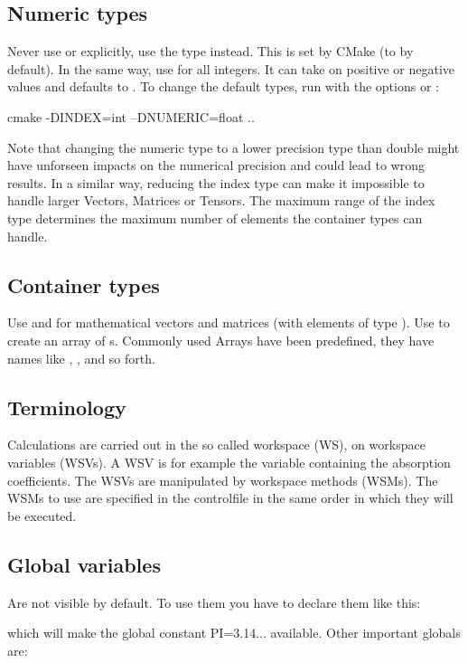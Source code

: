 \subsection{Numeric types} Never use  or
 explicitly, use the type  instead.
This is set by CMake (to  by default).
In the same way, use  for all integers. It can take on
positive or negative values and defaults to .
To change the default types, run  with the options
 or :

\begin{code}
cmake -DINDEX=int --DNUMERIC=float ..
\end{code}

Note that changing the numeric type to a lower precision type than
double might have unforseen impacts on the numerical precision and could
lead to wrong results. In a similar way, reducing the index type can
make it impossible to handle larger Vectors, Matrices or Tensors. The
maximum range of the index type determines the maximum number of
elements the container types can handle.

\subsection{Container types} Use  and
 for mathematical vectors and matrices (with elements
of type ). Use  to
create an array of s.
Commonly used Arrays have been predefined, they have names like
, , and so forth.

\subsection{Terminology}
Calculations are carried out in the so called workspace (WS), on
workspace variables (WSVs). A WSV is for example the variable
containing the absorption coefficients. The WSVs are manipulated by 
workspace methods (WSMs). The WSMs to use are specified in the
controlfile in the same order in which they will be
executed. 

\subsection{Global variables}
   Are not visible by default. To use them you have to declare them
   like this:
   \begin{quote}
   \end{quote}
   which will make the global constant PI=3.14... available. Other important globals are:

